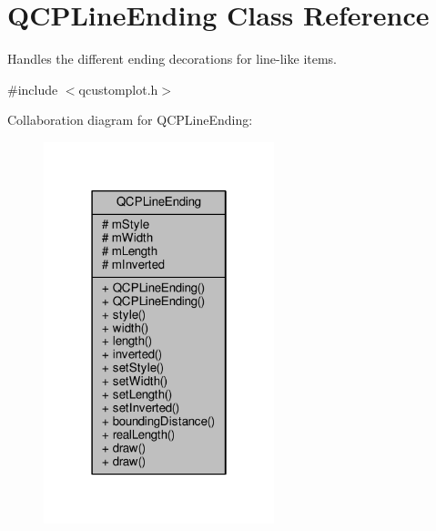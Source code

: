 \hypertarget{class_q_c_p_line_ending}{}\section{Q\+C\+P\+Line\+Ending Class Reference}
\label{class_q_c_p_line_ending}


Handles the different ending decorations for line-\/like items.  




{\ttfamily \#include $<$qcustomplot.\+h$>$}



Collaboration diagram for Q\+C\+P\+Line\+Ending\+:\nopagebreak
\begin{figure}[H]
\begin{center}
\leavevmode
\includegraphics[width=190pt]{class_q_c_p_line_ending__coll__graph}
\end{center}
\end{figure}
